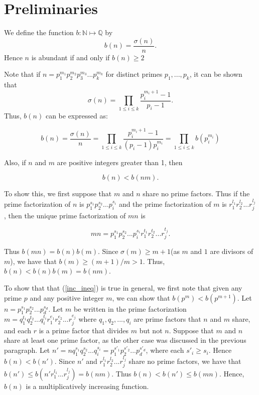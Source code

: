 \documentclass[../paper.tex]{article}
\begin{document}
\section{Preliminaries}

We define the function $b: \mathbb{N} \mapsto \mathbb{Q}$ by
%
$$b(n) = \frac{\sigma(n)}{n} .$$
%
Hence $n$ is abundant if and only if $b(n) \geq 2$

Note that if $n=p_1^{m_1}p_2^{m_2}p_3^{m_3}...p_{k}^{m_k}$ 
for distinct primes $p_1, ..., p_k$, it can be shown that 
%
$$\sigma(n) = \prod_{1 \leq i \leq k} \frac{p_i^{m_i + 1} -1}{p_i -1} .$$
%
Thus, $b(n)$ can be expressed as:


\begin{equation}\label{b_stuff}
  b(n) = \frac{\sigma(n)}{n} = \prod_{1 \leq i \leq k} 
  \frac{p_i^{m_i + 1} -1}{(p_i -1)p_{i}^{m_{i}}}
  =\prod_{1 \leq i \leq k} b(p_i^{m_i})
\end{equation}

Also, if $n$ and $m$ are positive integers greater than 1, then

\begin{equation}\label{inc_ineq}
  b(n) < b(nm). %
\end{equation}

To show this, we first suppose that $m$ and $n$ share no prime factors.
Thus if the prime factorization of $n$ is $p_1^{s_1} p_2^{s_2} ... p_i^{s_i}$ 
and the prime factorization of $m$ is $r_1^{l_1} r_2^{l_2} ... r_j^{l_j}$,
then the unique prime factorization of $mn$ is 

$$mn = p_1^{s_1} p_2^{s_2} ... p_i^{s_i} r_1^{t_1} r_2^{t_2} ... r_j^{t_j} .$$

Thus $b(mn) = b(n)b(m)$. Since $\sigma(m) \geq m + 1$(as $m$ and 
$1$ are divisors of $m$), we have that $b(m) \geq (m + 1) / m > 1$.
Thus,
$b(n) < b(n)b(m) = b(nm)$. 


To show that that (\ref{inc_ineq}) is true in general,
we first note that given any prime $p$ and
any positive integer $m$, we can show that $b(p^m) < b(p^{m + 1})$.
Let $n = p_1^{s_1} p_2^{s_2}... p_d^{s_d}$. 
Let $m$ be written in the prime factorization 
$m = q_1^{t_1} q_2^{t_2} ... q_i^{t_i} 
r_1^{e_1} r_2^{e_2} ... r_j^{e_j}$ where 
$q_1, q_2, ..., q_i$ are prime factors that $n$ and $m$ share,
and each $r$ is a prime factor that divides $m$ but not $n$.
Suppose that $m$ and $n$ share at least one prime factor, as the 
other case was discussed in the previous paragraph.
%
Let $n' = n q_1^{s_1} q_2^{s_2} ... q_i^{s_i} =
p_1^{s'_1} p_2^{s'_2} ... p_d^{s'_d}$, where each $s'_i \geq s_i$.
Hence $b(n) < b(n')$. Since $n'$ and $r_1^{l_1} r_2^{l_2} ... r_j^{l_j}$
share no prime factors, we have that 
$b(n') \leq b(n' r_1^{l_1} ... r_j^{l_j}) = b(nm)$.
Thus $b(n) < b(n') \leq b(mn)$. Hence, $b(n)$ is a 
multiplicatively increasing function.
\\
\end{document}
